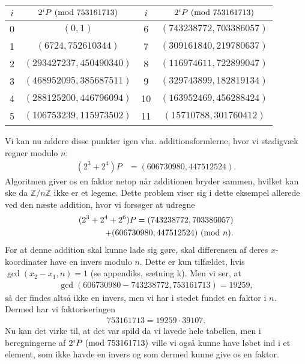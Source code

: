 \begin{example}
\begin{center}
\begin{tabular}{c c c c}
$i$ & $2^i P \ (\mathrm{mod} \ 753161713)$ & $i$ & $2^i P \ (\mathrm{mod} \ 753161713)$ \\ 
\hline 
0 & $(0, 1)$ & 6 & $(743238772, 703386057)$  \\ 
1 & $(6724, 752610344)$ & 7 & $(309161840, 219780637)$  \\ 
2 & $(293427237, 450490340)$ & 8 & $(116974611, 722899047)$ \\ 
3 & $(468952095, 385687511)$ & 9 & $(329743899, 182819134)$ \\ 
4 & $(288125200, 446796094)$ & 10 & $(163952469, 456288424)$ \\ 
5 & $(106753239, 115973502)$ & 11 & $(15710788, 301760412)$
\end{tabular} 
\end{center}
Vi kan nu addere disse punkter igen vha. additionsformlerne, hvor vi stadigvæk regner modulo $n$:
\begin{align*}
	(2^3 + 2^4)P &= (606730980, 447512524). 
\end{align*}
Algoritmen giver os en faktor netop når additionen bryder sammen, hvilket kan ske da $\mathbb{Z}/n \mathbb{Z}$ ikke er et legeme. Dette problem viser sig i dette eksempel allerede ved den næste addition, hvor vi forsøger at udregne
\begin{align*}
	(2^3 + 2^4 + 2^6) P = (743238772, 703386057) \\ + (606730980, 447512524) \ (\mathrm{mod} \ n).
\end{align*}
For at denne addition skal kunne lade sig gøre, skal differensen af deres $x$-koordinater have en invers modulo $n$. Dette er kun tilfældet, hvis $\gcd(x_2 - x_1, n) = 1$ (se appendiks, sætning k). Men vi ser, at
\begin{align*}
	\gcd(606730980 - 743238772, 753161713) = 19259,
\end{align*}
så der findes altså ikke en invers, men vi har i stedet fundet en faktor i $n$. Dermed har vi faktoriseringen
\begin{align*}
	753161713 = 19259 \cdot 39107.
\end{align*}
Nu kan det virke til, at det var spild da vi lavede hele tabellen, men i beregningerne af $2^i P \ (\mathrm{mod} \ 753161713)$ ville vi også kunne have løbet ind i et element, som ikke havde en invers og som dermed kunne give os en faktor.
\end{example}



